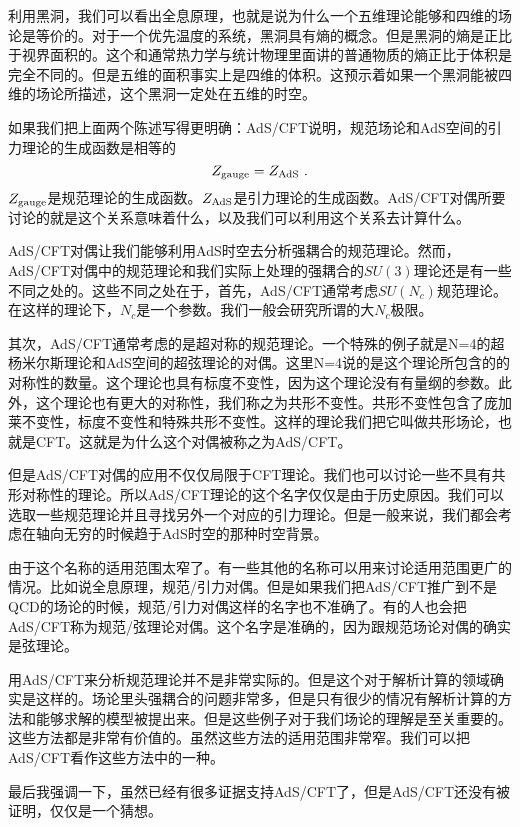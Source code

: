 利用黑洞，我们可以看出全息原理，也就是说为什么一个五维理论能够和四维的场论是等价的。对于一个优先温度的系统，黑洞具有熵的概念。但是黑洞的熵是正比于视界面积的。这个和通常热力学与统计物理里面讲的普通物质的熵正比于体积是完全不同的。但是五维的面积事实上是四维的体积。这预示着如果一个黑洞能被四维的场论所描述，这个黑洞一定处在五维的时空。

如果我们把上面两个陈述写得更明确：AdS/CFT说明，规范场论和AdS空间的引力理论的生成函数是相等的
\begin{equation}
Z_{\rm gauge}=Z_{\rm AdS}~.
\end{equation}
$Z_{\rm gauge}$是规范理论的生成函数。$Z_{\rm AdS}$是引力理论的生成函数。AdS/CFT对偶所要讨论的就是这个关系意味着什么，以及我们可以利用这个关系去计算什么。

AdS/CFT对偶让我们能够利用AdS时空去分析强耦合的规范理论。然而，AdS/CFT对偶中的规范理论和我们实际上处理的强耦合的$SU(3)$理论还是有一些不同之处的。这些不同之处在于，首先，AdS/CFT通常考虑$SU(N_c)$规范理论。在这样的理论下，$N_c$是一个参数。我们一般会研究所谓的大$N_c$极限。

其次，AdS/CFT通常考虑的是超对称的规范理论。一个特殊的例子就是N=4的超杨米尔斯理论和AdS空间的超弦理论的对偶。这里N=4说的是这个理论所包含的的对称性的数量。这个理论也具有标度不变性，因为这个理论没有有量纲的参数。此外，这个理论也有更大的对称性，我们称之为共形不变性。共形不变性包含了庞加莱不变性，标度不变性和特殊共形不变性。这样的理论我们把它叫做共形场论，也就是CFT。这就是为什么这个对偶被称之为AdS/CFT。

但是AdS/CFT对偶的应用不仅仅局限于CFT理论。我们也可以讨论一些不具有共形对称性的理论。所以AdS/CFT理论的这个名字仅仅是由于历史原因。我们可以选取一些规范理论并且寻找另外一个对应的引力理论。但是一般来说，我们都会考虑在轴向无穷的时候趋于AdS时空的那种时空背景。

由于这个名称的适用范围太窄了。有一些其他的名称可以用来讨论适用范围更广的情况。比如说全息原理，规范/引力对偶。但是如果我们把AdS/CFT推广到不是QCD的场论的时候，规范/引力对偶这样的名字也不准确了。有的人也会把AdS/CFT称为规范/弦理论对偶。这个名字是准确的，因为跟规范场论对偶的确实是弦理论。

用AdS/CFT来分析规范理论并不是非常实际的。但是这个对于解析计算的领域确实是这样的。场论里头强耦合的问题非常多，但是只有很少的情况有解析计算的方法和能够求解的模型被提出来。但是这些例子对于我们场论的理解是至关重要的。这些方法都是非常有价值的。虽然这些方法的适用范围非常窄。我们可以把AdS/CFT看作这些方法中的一种。

最后我强调一下，虽然已经有很多证据支持AdS/CFT了，但是AdS/CFT还没有被证明，仅仅是一个猜想。


